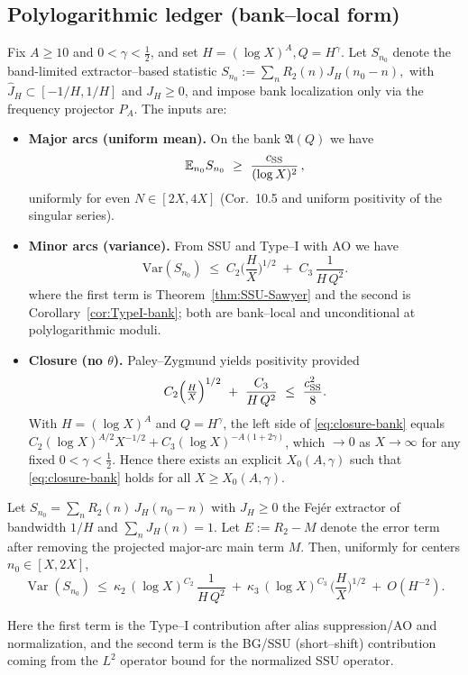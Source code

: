 \subsection{Polylogarithmic ledger (bank--local form)}\label{sec:polylog-ledger}
Fix \(A\ge 10\) and \(0<\gamma<\tfrac12\), and set \(H=(\log X)^A, Q=H^\gamma\).
Let \(S_{n_0}\) denote the band-limited extractor–based statistic
\(
S_{n_0}:=\sum_{n} R_2(n) J_H(n_0-n),
\)
with \(\widehat J_H\subset[-1/H,1/H]\) and \(J_H\ge 0\), and impose bank localization only via the frequency projector \(P_A\). The inputs are:

\begin{itemize}
\item \textbf{Major arcs (uniform mean).} On the bank $\mathfrak A(Q)$ we have
\[
\mathbb E_{n_0}S_{n_0}\ \ge\ \frac{c_{\rm SS}}{(\log X)^2}\,,
\]
uniformly for even $N\in[2X,4X]$ (Cor.~10.5 and uniform positivity of the singular series).

\item \textbf{Minor arcs (variance).} From SSU and Type--I with AO we have
\begin{equation}\label{eq:ledger-variance}
\mathrm{Var}(S_{n_0})
\;\le\;
C_2\Big(\frac{H}{X}\Big)^{1/2}
\;+\;
C_3\,\frac{1}{H\,Q^2}.
\tag{5.15}
\end{equation}
where the first term is Theorem~\ref{thm:SSU-Sawyer} and the second is Corollary~\ref{cor:TypeI-bank}; both are bank--local and unconditional at polylogarithmic moduli.

\item \textbf{Closure (no $\theta$).} Paley--Zygmund yields positivity provided
\begin{equation}\label{eq:closure-bank}
C_2\Big(\tfrac{H}{X}\Big)^{1/2}\ +\ \frac{C_3}{H\,Q^2}\ \le\ \frac{c_{\rm SS}^2}{8}.
\end{equation}
With $H=(\log X)^A$ and $Q=H^\gamma$, the left side of \eqref{eq:closure-bank} equals 
$C_2(\log X)^{A/2}X^{-1/2}+C_3(\log X)^{-A(1+2\gamma)}$, which $\to 0$ as $X\to\infty$ for any fixed $0<\gamma<\tfrac12$. 
Hence there exists an explicit $X_0(A,\gamma)$ such that \eqref{eq:closure-bank} holds for all $X\ge X_0(A,\gamma)$.
\end{itemize}

\begin{proposition}\label{prop:audit}
Let $S_{n_0}=\sum_{n} R_2(n)\,J_H(n_0-n)$ with $J_H\ge0$ the Fejér extractor of bandwidth $1/H$ and $\sum_n J_H(n)=1$.
Let $E:=R_2-M$ denote the error term after removing the projected major-arc main term $M$.
Then, uniformly for centers $n_0\in[X,2X]$,
\begin{equation}\label{eq:audit}
\operatorname{Var}(S_{n_0})
\ \le\
\kappa_2\,(\log X)^{C_2}\,\frac{1}{H\,Q^2}
\ +\
\kappa_3\,(\log X)^{C_3}\,\Big(\frac{H}{X}\Big)^{1/2}
\ +\ O(H^{-2}).
\end{equation}

Here the first term is the Type–I contribution after alias suppression/AO and normalization, and the second term is the BG/SSU (short–shift) contribution coming from the $L^2$ operator bound for the normalized SSU operator.
\end{proposition}

